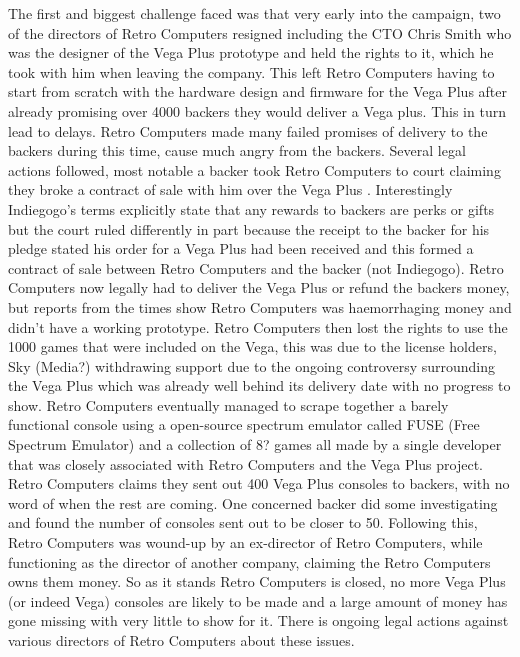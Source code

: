 The first and biggest challenge faced was that very early into the campaign, two of the directors of Retro Computers resigned including the CTO Chris Smith who was the designer of the Vega Plus prototype and held the rights to it, which he took with him when leaving the company. This left Retro Computers having to start from scratch with the hardware design and firmware for the Vega Plus after already promising over 4000 backers they would deliver a Vega plus. This in turn lead to delays. Retro Computers made many failed promises of delivery to the backers during this time, cause much angry from the backers. Several legal actions followed, most notable a backer took Retro Computers to court claiming they broke a contract of sale with him over the Vega Plus 
\cite{RN122}. Interestingly Indiegogo's terms explicitly state that any rewards to backers are perks or gifts but the court ruled differently in part because the receipt to the backer for his pledge stated his order for a Vega Plus had been received and this formed a contract of sale between Retro Computers and the backer (not Indiegogo). Retro Computers now legally had to deliver the Vega Plus or refund the backers money, but reports from the times show Retro Computers was haemorrhaging money and didn't have a working prototype. Retro Computers then lost the rights to use the 1000 games that were included on the Vega, this was due to the license holders, Sky (Media?) withdrawing support due to the ongoing controversy surrounding the Vega Plus which was already well behind its delivery date with no progress to show. Retro Computers eventually managed to scrape together a barely functional console using a open-source spectrum emulator called FUSE (Free Spectrum Emulator) and a collection of 8? games all made by a single developer that was closely associated with Retro Computers and the Vega Plus project. Retro Computers claims they sent out 400 Vega Plus consoles to backers, with no word of when the rest are coming. One concerned backer did some investigating and found the number of consoles sent out to be closer to 50. Following this, Retro Computers was wound-up by an ex-director of Retro Computers, while functioning as the director of another company, claiming the Retro Computers owns them money. So as it stands Retro Computers is closed, no more Vega Plus (or indeed Vega) consoles are likely to be made and a large amount of money has gone missing with very little to show for it. There is ongoing legal actions against various directors of Retro Computers about these issues.\\

